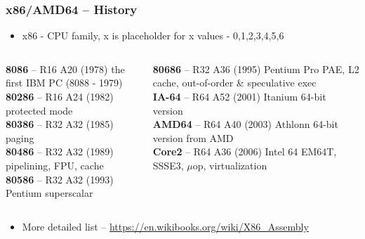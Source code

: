 \documentclass{beamer}
\begin{document}
\begin{frame}
\frametitle{x86/AMD64 -- History}
\begin{itemize}
\item x86 - CPU family, x is placeholder for x values - 0,1,2,3,4,5,6
\end{itemize}

\begin{columns}[t,onlytextwidth]
\begin{column}{0.48\textwidth}
\textbf{8086} -- R16 A20 (1978) the first IBM PC (8088 - 1979) \\
\textbf{80286} -- R16 A24 (1982) protected mode\\
\textbf{80386} -- R32 A32 (1985) paging\\
\textbf{80486} -- R32 A32 (1989) pipelining, FPU, cache\\
\textbf{80586} -- R32 A32 (1993) Pentium superscalar\\
\end{column}
\begin{column}{0.48\textwidth}  
\textbf{80686} -- R32 A36 (1995) Pentium Pro PAE, L2 cache, out-of-order \& speculative exec\\
\textbf{IA-64} -- R64 A52 (2001) Itanium 64-bit version\\
\textbf{AMD64} -- R64 A40 (2003) Athlonn 64-bit version from AMD\\
\textbf{Core2} -- R64 A36 (2006) Intel 64 EM64T, SSSE3, $\mu$op, virtualization
\end{column}
\end{columns}

\begin{itemize}
\item More detailed list -- \url{https://en.wikibooks.org/wiki/X86\_Assembly}
\end{itemize}

\end{frame}
\end{document}

